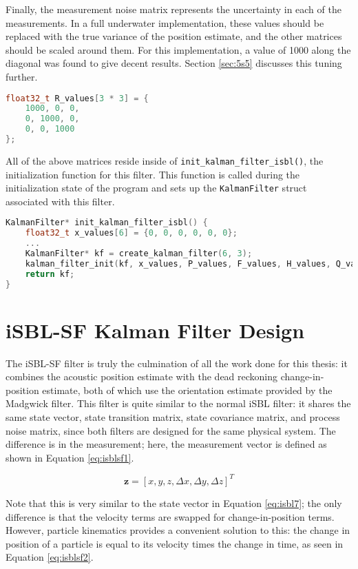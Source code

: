\documentclass[11pt]{ucthesisCP}
\begin{document}
Finally, the measurement noise matrix represents the uncertainty in each of the measurements. In a full underwater implementation, these values should be replaced with the true variance of the position estimate, and the other matrices should be scaled around them. For this implementation, a value of 1000 along the diagonal was found to give decent results. Section \ref{sec:5s5} discusses this tuning further.

\begin{lstlisting}[language=C++]
float32_t R_values[3 * 3] = {
	1000, 0, 0,
	0, 1000, 0,
	0, 0, 1000
};
\end{lstlisting}

All of the above matrices reside inside of \verb|init_kalman_filter_isbl()|, the initialization function for this filter. This function is called during the initialization state of the program and sets up the \verb|KalmanFilter| struct associated with this filter.

\begin{lstlisting}[language=C++]
KalmanFilter* init_kalman_filter_isbl() {
	float32_t x_values[6] = {0, 0, 0, 0, 0, 0};
	...
	KalmanFilter* kf = create_kalman_filter(6, 3);
	kalman_filter_init(kf, x_values, P_values, F_values, H_values, Q_values, R_values);
	return kf;
}
\end{lstlisting}

\section{iSBL-SF Kalman Filter Design} \label{sec:5s4}
The iSBL-SF filter is truly the culmination of all the work done for this thesis: it combines the acoustic position estimate with the dead reckoning change-in-position estimate, both of which use the orientation estimate provided by the Madgwick filter. This filter is quite similar to the normal iSBL filter: it shares the same state vector, state transition matrix, state covariance matrix, and process noise matrix, since both filters are designed for the same physical system. The difference is in the measurement; here, the measurement vector is defined as shown in Equation \ref{eq:isblsf1}.

\begin{equation} \label{eq:isblsf1}
	\mathbf{z} = [x, y, z, \Delta x, \Delta y, \Delta z]^T
\end{equation}

Note that this is very similar to the state vector in Equation \ref{eq:isbl7}; the only difference is that the velocity terms are swapped for change-in-position terms. However, particle kinematics provides a convenient solution to this: the change in position of a particle is equal to its velocity times the change in time, as seen in Equation \ref{eq:isblsf2}. 
\end{document}
